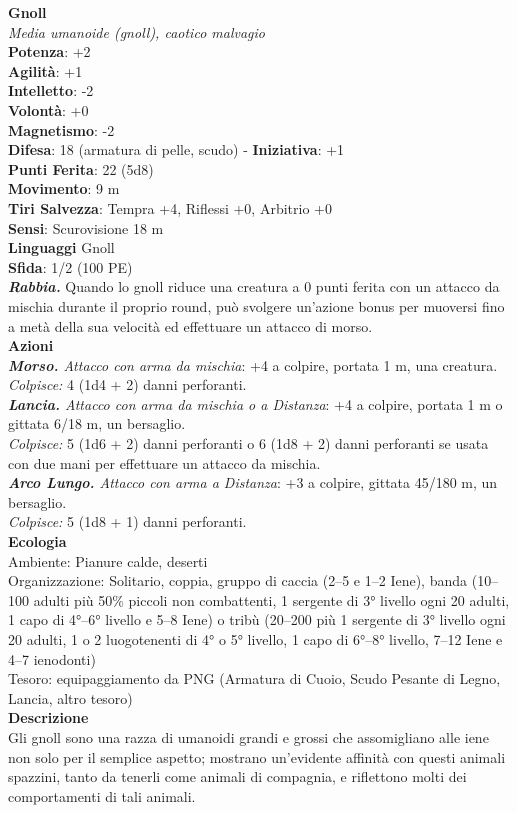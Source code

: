 \begin{multicols}{2}
\medskip\textbf{Gnoll}\\
\emph{Media umanoide (gnoll), caotico malvagio}\\
\textbf{Potenza}: +2\\
\textbf{Agilità}: +1\\
\textbf{Intelletto}: -2\\
\textbf{Volontà}: +0\\
\textbf{Magnetismo}: -2\\
\textbf{Difesa}: 18 (armatura di pelle, scudo) - \textbf{Iniziativa}: +1\\
\textbf{Punti Ferita}: 22 (5d8)\\
\textbf{Movimento}: 9 m\\
\textbf{Tiri Salvezza}: Tempra +4, Riflessi +0, Arbitrio +0\\
\textbf{Sensi}: Scurovisione 18 m\\
\textbf{Linguaggi} Gnoll\\
\textbf{Sfida}: 1/2 (100 PE)\smallskip\\
\emph{\textbf{Rabbia.}} Quando lo gnoll riduce una creatura a 0 punti ferita con un attacco da mischia durante il proprio round, può svolgere un'azione bonus per muoversi fino a metà della sua velocità ed effettuare un attacco di morso.\\
\smallskip\textbf{Azioni}\\
\emph{\textbf{Morso.} Attacco con arma da mischia}: +4 a colpire, portata 1 m, una creatura.\\
\emph{Colpisce:} 4 (1d4 + 2) danni perforanti.\\
\emph{\textbf{Lancia.} Attacco con arma da mischia o a Distanza}: +4 a colpire, portata 1 m o gittata 6/18 m, un bersaglio.\\
\emph{Colpisce:} 5 (1d6 + 2) danni perforanti o 6 (1d8 + 2) danni perforanti se usata con due mani per effettuare un attacco da mischia.\\
\emph{\textbf{Arco Lungo.} Attacco con arma a Distanza}: +3 a colpire, gittata 45/180 m, un bersaglio.\\
\emph{Colpisce:} 5 (1d8 + 1) danni perforanti.\\
\textbf{Ecologia}\\
Ambiente: Pianure calde, deserti\\
Organizzazione: Solitario, coppia, gruppo di caccia (2–5 e 1–2 Iene), banda (10–100 adulti più 50\% piccoli non combattenti, 1 sergente di 3° livello ogni 20 adulti, 1 capo di 4°–6° livello e 5–8 Iene) o tribù (20–200 più 1 sergente di 3° livello ogni 20 adulti, 1 o 2 luogotenenti di 4° o 5° livello, 1 capo di 6°–8° livello, 7–12 Iene e 4–7 ienodonti)\\
Tesoro: equipaggiamento da PNG (Armatura di Cuoio, Scudo Pesante di Legno, Lancia, altro tesoro)\\
\textbf{Descrizione}\\
Gli gnoll sono una razza di umanoidi grandi e grossi che assomigliano alle iene non solo per il semplice aspetto; mostrano un’evidente affinità con questi animali spazzini, tanto da tenerli come animali di compagnia, e riflettono molti dei comportamenti di tali animali.\\


\end{multicols}
